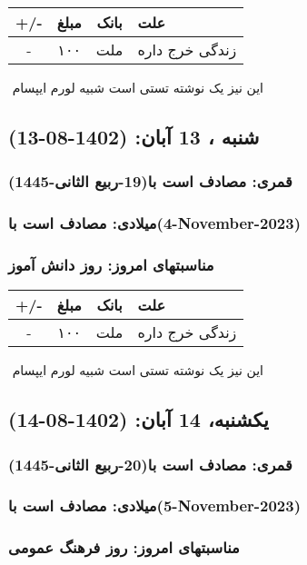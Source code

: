 \documentclass{article}
\newcommand{\rnote}[1]{\marginpar{\textcolor{color}{\StrSubstitute{\##1}{ }{\_}}}}
\newcommand{\myRow}[4]{
    #1 & #2 & #3 & #4 \\ \hline
}
\begin{document}
\begin{tabular}{ | c | c | c | p{5cm} |}
    \hline
    \myRow{ +/- }{مبلغ}{بانک}{علت}
    \myRow{-}{۱۰۰}{ملت}{زندگی خرج داره}
\end{tabular}
\newline
\newline

‌
\rnote{تست}
این نیز یک نوشته تستی است شبیه لورم ایپسام




\newpage
{}
\textcolor{color}{
\section{ شنبه ، 13 آبان: (1402-08-13) }
\subsubsection*{قمری: مصادف است با(19-ربیع الثانی-1445)} 
\subsubsection*{میلادی: مصادف است با(4-November-2023)}
\subsubsection*{مناسبتهای امروز: روز دانش آموز}
}


\begin{tabular}{ | c | c | c | p{5cm} |}
    \hline
    \myRow{ +/- }{مبلغ}{بانک}{علت}
    \myRow{-}{۱۰۰}{ملت}{زندگی خرج داره}
\end{tabular}
\newline
\newline

‌
\rnote{تست}
این نیز یک نوشته تستی است شبیه لورم ایپسام




\newpage
{}
\textcolor{color}{
\section{ یکشنبه، 14 آبان: (1402-08-14) }
\subsubsection*{قمری: مصادف است با(20-ربیع الثانی-1445)} 
\subsubsection*{میلادی: مصادف است با(5-November-2023)}
\subsubsection*{مناسبتهای امروز: روز فرهنگ عمومی}
}
\end{document}
